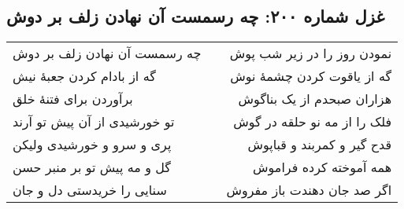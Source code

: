 \begin{center}
\section*{غزل شماره ۲۰۰: چه رسمست آن نهادن زلف بر دوش}
\label{sec:200}
\begin{longtable}{l p{0.5cm} r}
چه رسمست آن نهادن زلف بر دوش
&&
نمودن روز را در زیر شب پوش
\\
گه از بادام کردن جعبهٔ نیش
&&
گه از یاقوت کردن چشمهٔ نوش
\\
برآوردن برای فتنهٔ خلق
&&
هزاران صبحدم از یک بناگوش
\\
تو خورشیدی از آن پیش تو آرند
&&
فلک را از مه نو حلقه در گوش
\\
پری و سرو و خورشیدی ولیکن
&&
قدح گیر و کمربند و قباپوش
\\
گل و مه پیش تو بر منبر حسن
&&
همه آموخته کرده فراموش
\\
سنایی را خریدستی دل و جان
&&
اگر صد جان دهندت باز مفروش
\\
\end{longtable}
\end{center}
